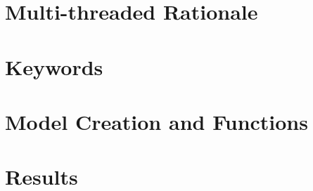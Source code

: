 \documentclass[paper=letter, fontsize=11pt]{scrartcl}
\numberwithin{equation}{section}		%
\numberwithin{figure}{section}			%
\numberwithin{table}{section}				%
\begin{document}
\begin{spacing}{2}
\section{Multi-threaded Rationale}
\section{Keywords}
\section{Model Creation and Functions}
\section{Results}





\end{spacing}

 
\end{document}
